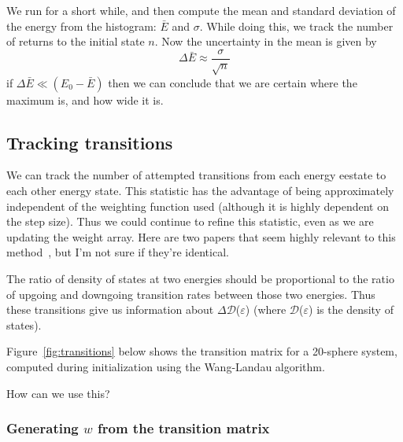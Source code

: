 \documentclass[letterpaper,twocolumn,amsmath,amssymb,pre,aps,10pt]{revtex4-1}
\begin{document}
We run for a short while, and then compute the mean and standard
deviation of the energy from the histogram: $\bar E$ and $\sigma$.
While doing this, we track the number of returns to the initial state
$n$.  Now the uncertainty in the mean is given by
\begin{equation}
  \Delta \bar E \approx \frac{\sigma}{\sqrt{n}}
\end{equation}
if $\Delta \bar E \ll (E_0 - \bar E)$ then we can conclude that we are
certain where the maximum is, and how wide it is.


\subsection{Tracking transitions}

We can track the number of attempted transitions from each energy
eestate to each other energy state.  This statistic has the advantage of
being approximately independent of the weighting function used
(although it is highly dependent on the step size).  Thus we could
continue to refine this statistic, even as we are updating the weight
array.  Here are two papers that seem highly relevant to this
method~\cite{wang1999transition, wang2002transition}, but I'm not sure
if they're identical.

The ratio of density of states at two energies should be proportional
to the ratio of upgoing and downgoing transition rates between those
two energies.  Thus these transitions give us information about
$\Delta$$\mathcal{D}$($\varepsilon$) (where $\mathcal{D}$($\varepsilon$)
is the density of states).

Figure~\ref{fig:transitions} below shows the transition matrix for a
20-sphere system, computed during initialization using the Wang-Landau
algorithm.

How can we use this?

\subsubsection{Generating $w$ from the transition matrix}
\end{document}

